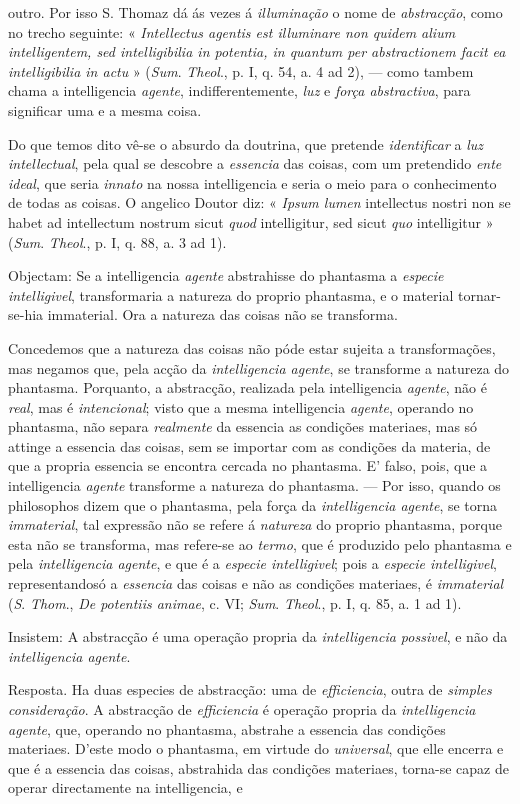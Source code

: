 outro. Por isso S. Thomaz dá ás vezes á \emph{illuminação} o nome de \emph{abstracção}, como no trecho seguinte: « \emph{Intellectus agentis est illuminare non quidem alium intelligentem, sed intelligibilia in potentia, in quantum per abstractionem facit ea intelligibilia in actu} » (\emph{Sum}. \emph{Theol}., p. I, q. 54, a. 4 ad 2), --- como tambem chama a intelligencia \emph{agente}, indifferentemente, \emph{luz} e \emph{força abstractiva}, para significar uma e a mesma coisa.\par Do que temos dito vê-se o absurdo da doutrina, que pretende \emph{identificar} a \emph{luz intellectual}, pela qual se descobre a \emph{essencia} das coisas, com um pretendido \emph{ente ideal}, que seria \emph{innato} na nossa intelligencia e seria o meio para o conhecimento de todas as coisas. O angelico Doutor diz: « \emph{Ipsum lumen} intellectus nostri non se habet ad intellectum nostrum sicut \emph{quod} intelligitur, sed sicut \emph{quo} intelligitur » (\emph{Sum}. \emph{Theol}., p. I, q. 88, a. 3 ad 1).\par Objectam: Se a intelligencia \emph{agente} abstrahisse do phantasma a \emph{especie intelligivel}, transformaria a natureza do proprio phantasma, e o material tornar-se-hia immaterial. Ora a natureza das coisas não se transforma.\par Concedemos que a natureza das coisas não póde estar sujeita a transformações, mas negamos que, pela acção da \emph{intelligencia agente}, se transforme a natureza do phantasma. Porquanto, a abstracção, realizada pela intelligencia \emph{agente}, não é \emph{real}, mas é \emph{intencional}; visto que a mesma intelligencia \emph{agente}, operando no phantasma, não separa \emph{realmente} da essencia as condições materiaes, mas só attinge a essencia das coisas, sem se importar com as condições da materia, de que a propria essencia se encontra cercada no phantasma. E' falso, pois, que a intelligencia \emph{agente} transforme a natureza do phantasma. --- Por isso, quando os philosophos dizem que o phantasma, pela força da \emph{intelligencia agente}, se torna \emph{immaterial}, tal expressão não se refere á \emph{natureza} do proprio phantasma, porque esta não se transforma, mas refere-se ao \emph{termo}, que é produzido pelo phantasma e pela \emph{intelligencia agente}, e que é a \emph{especie intelligivel}; pois a \emph{especie intelligivel}, representandosó a \emph{essencia} das coisas e não as condições materiaes, é \emph{immaterial} (\emph{S}. \emph{Thom}., \emph{De potentiis animae}, c. VI; \emph{Sum}. \emph{Theol}., p. I, q. 85, a. 1 ad 1).\par Insistem: A abstracção é uma operação propria da \emph{intelligencia possivel}, e não da \emph{intelligencia agente}.\par Resposta. Ha duas especies de abstracção: uma de \emph{efficiencia}, outra de \emph{simples consideração}. A abstracção de \emph{efficiencia} é operação propria da \emph{intelligencia agente}, que, operando no phantasma, abstrahe a essencia das condições materiaes. D'este modo o phantasma, em virtude do \emph{universal}, que elle encerra e que é a essencia das coisas, abstrahida das condições materiaes, torna-se capaz de operar directamente na intelligencia, e 